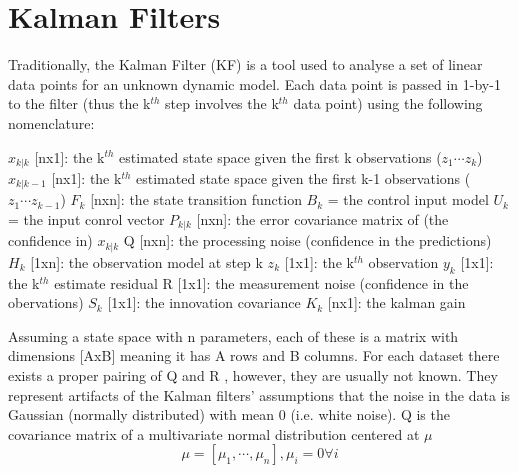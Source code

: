 \section{Kalman Filters}
Traditionally, the Kalman Filter (KF) is a tool used to analyse a set of linear data points for an unknown dynamic model. Each data point is passed in 1-by-1 to the filter (thus the k$^{th}$ step involves the k$^{th}$ data point) using the following nomenclature:\newline

$\hat{x}_{k|k}$ [nx1]:    the k$^{th}$ estimated state space given the first k observations ($z_{1} \cdots z_{k}$)\newline
$\hat{x}_{k|k-1}$ [nx1]:  the k$^{th}$ estimated state space given the first k-1 observations ($z_{1} \cdots z_{k-1}$)\newline
$F_{k}$ [nxn]:  the state transition function\newline
$B_{k}$ = the control input model \newline
$U_{k}$ = the input conrol vector\newline
$P_{k|k}$ [nxn]:  the error covariance matrix of (the confidence in) $x_{k|k}$\newline
Q [nxn]:    the processing noise (confidence in the predictions)\newline
$H_{k}$ [1xn]: the observation model at step k\newline
$z_{k}$ [1x1]: the k$^{th}$ observation\newline
$y_{k}$ [1x1]: the k$^{th}$ estimate residual\newline
R [1x1]: the measurement noise (confidence in the obervations)\newline
$S_{k}$ [1x1]: the innovation covariance\newline
$K_{k}$ [nx1]: the kalman gain\newline

Assuming a state space with n parameters, each of these is a matrix with dimensions [AxB] meaning it has A rows and B columns. For each dataset there exists a proper pairing of Q and R , however, they are usually not known. They represent artifacts of the Kalman filters' assumptions that the noise in the data is Gaussian (normally distributed) with mean 0 (i.e. white noise). Q is the covariance matrix of a multivariate normal distribution centered at $\mu$
\begin{equation}
    \mu = [\mu_{1}, \cdots , \mu_{n}], \mu_{i} = 0  \forall i
\end{equation}

